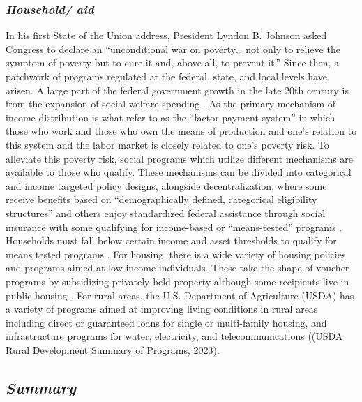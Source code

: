 \subsubsection{\textit{Household/ aid}}
In his first State of the Union address, President Lyndon B. Johnson asked Congress to declare an “unconditional war on poverty… not only to relieve the symptom of poverty but to cure it and, above all, to prevent it.” Since then, a patchwork of programs regulated at the federal, state, and local levels have arisen. A large part of the federal government growth in the late 20th century is from the expansion of social welfare spending \citep{fishback_social_2020}. As the primary mechanism of income distribution is what \citet{berkowitz_gaps_2023} refer to as the “factor payment system” in which those who work and those who own the means of production and one’s relation to this system and the labor market is closely related to one’s poverty risk. To alleviate this poverty risk, social programs which utilize different mechanisms are available to those who qualify. These mechanisms can be divided into categorical and income targeted policy designs, alongside decentralization, where some receive benefits based on “demographically defined, categorical eligibility structures” and others enjoy standardized federal assistance through social insurance with some qualifying for income-based or “means-tested” programs \citep{bruch_poverty_2023}. Households must fall below certain income and asset thresholds to qualify for means tested programs \citep{rank_welfare_2002}. For housing, there is a wide variety of housing policies and programs aimed at low-income individuals. These take the shape of voucher programs by subsidizing privately held property although some recipients live in public housing \citep{kim_housing_2017}. For rural areas, the U.S. Department of Agriculture (USDA) has a variety of programs aimed at improving living conditions in rural areas including direct or guaranteed loans for single or multi-family housing, and infrastructure programs for water, electricity, and telecommunications ((USDA Rural Development Summary of Programs, 2023). 

\subsection{\textit{Summary}}
\endinput